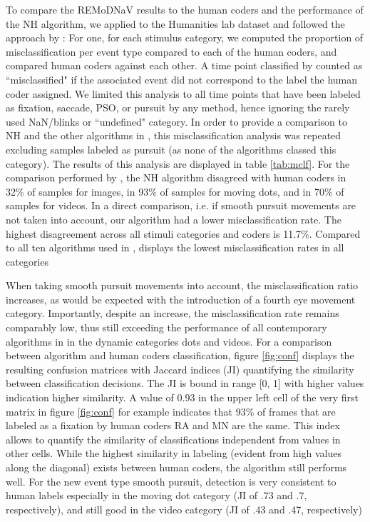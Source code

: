 To compare the REMoDNaV results to the human coders and the performance of the
NH algorithm, we applied \remodnav to the Humanities lab dataset and followed
the approach by \citet{Andersson2017}: For one, for each stimulus category, we
computed the proportion of misclassification per event type compared to each of
the human coders, and compared human coders against each other. A time point
classified by \remodnav counted as ``misclassified" if the associated event did
not correspond to the label the human coder assigned. We limited this analysis
to all time points that have been labeled as fixation, saccade, PSO, or pursuit
by any method, hence ignoring the rarely used NaN/blinks or ``undefined"
category. In order to provide a comparison to NH and the other algorithms in
\cite{Andersson2017}, this misclassification analysis was repeated excluding
samples labeled as pursuit (as none of the algorithms classed this category).
The results of this analysis are displayed in table \ref{tab:mclf}. For the
comparison performed by \citet{Andersson2017}, the NH algorithm disagreed with
human coders in 32\% of samples for images, in 93\% of samples for moving dots,
and in 70\% of samples for videos. In a direct comparison, i.e. if smooth
pursuit movements are not taken into account, our algorithm had a lower
misclassification rate. The highest disagreement across all stimuli categories
and coders is 11.7\%. Compared to all ten algorithms used in
\citet{Andersson2017}, \remodnav displays the lowest misclassification rates in
all categories

When taking smooth pursuit movements into account, the misclassification ratio
increases, as would be expected with the introduction of a fourth eye movement
category. Importantly, despite an increase, the misclassification rate remains
comparably low, thus still exceeding the performance of all contemporary
algorithms in \citet{Andersson2017} in the dynamic categories dots and videos.
For a comparison between algorithm and human coders classification, figure
\ref{fig:conf} displays the resulting confusion matrices with Jaccard indices
(JI) quantifying the similarity between classification decisions. The JI is
bound in range [0, 1] with higher values indication higher similarity. A value
of 0.93 in the upper left cell of the very first matrix in figure
\ref{fig:conf} for example indicates that 93\% of frames that are labeled as a
fixation by human coders RA and MN are the same. This index allows to quantify
the similarity of classifications independent from values in other cells. While
the highest similarity in labeling (evident from high values along the
diagonal) exists between human coders, the algorithm still performs well. For
the new event type smooth pursuit, detection is very consistent to human labels
especially in the moving dot category (JI of .73 and .7, respectively), and
still good in the video category (JI of .43 and .47, respectively)

